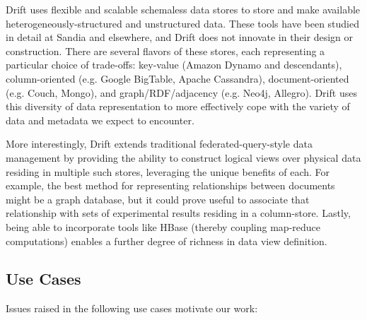 Drift uses flexible and scalable schemaless data stores to store and make available
heterogeneously-structured and unstructured data. These tools have been studied in detail at Sandia and
elsewhere, and Drift does not innovate in their design or construction. There are several flavors of
these stores, each representing a particular choice of trade-offs: key-value (Amazon
Dynamo\cite{Hastorun07dynamo:amazons} and descendants), column-oriented (e.g. Google
BigTable\cite{Chang06bigtable:a}, Apache Cassandra), document-oriented (e.g. Couch, Mongo), and
graph/RDF/adjacency (e.g. Neo4j, Allegro). Drift uses this diversity of data representation to more
effectively cope with the variety of data and metadata we expect to encounter.

More interestingly, Drift extends traditional federated-query-style data management by providing the
ability to construct logical views over physical data residing in multiple such stores, leveraging the
unique benefits of each. For example, the best method for representing relationships between documents
might be a graph database, but it could prove useful to associate that relationship with sets of
experimental results residing in a column-store. Lastly, being able to incorporate tools like HBase
(thereby coupling map-reduce computations) enables a further degree of richness in data view definition.

\subsection{Use Cases}

Issues raised in the following use cases motivate our work:

